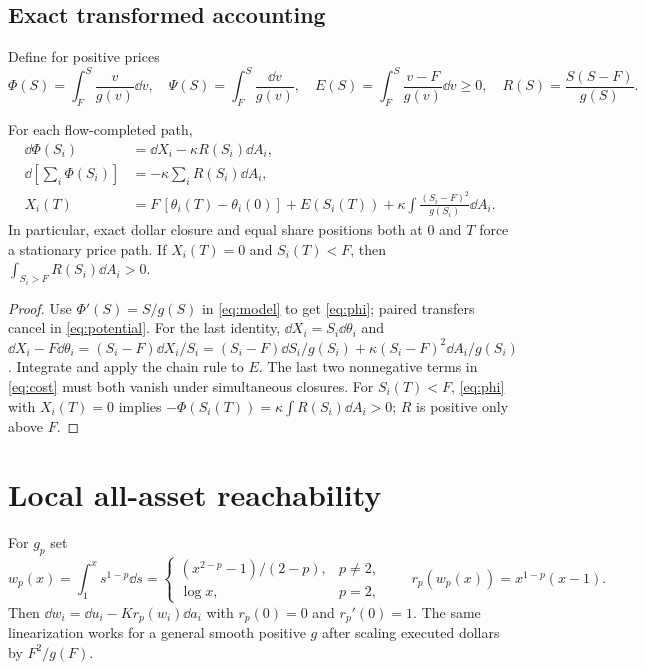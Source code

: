 \documentclass[review,hidelinks,onefignum,onetabnum]{siamonline250211}%
\begin{document}
\subsection{Exact transformed accounting}
Define for positive prices
\begin{equation}\label{eq:coords}
 \Phi(S)=\int_F^S\frac{v}{g(v)}\dd v,\quad
 \Psi(S)=\int_F^S\frac{\dd v}{g(v)},\quad
 E(S)=\int_F^S\frac{v-F}{g(v)}\dd v\ge0,\quad
 R(S)=\frac{S(S-F)}{g(S)}.
\end{equation}
\begin{proposition}\label{prop:account}
For each flow-completed path,
\begin{align}
 \dd\Phi(S_i)&=\dd X_i-\kappa R(S_i)\dd A_i,\label{eq:phi}\\
 \dd\left[\sum_i\Phi(S_i)\right]&=-\kappa\sum_iR(S_i)\dd A_i,\label{eq:potential}\\
 X_i(T)&=F\,[\theta_i(T)-\theta_i(0)]+E(S_i(T))
  +\kappa\int\frac{(S_i-F)^2}{g(S_i)}\dd A_i.\label{eq:cost}
\end{align}
In particular, exact dollar closure and equal share positions both at $0$
and $T$ force a stationary price path. If $X_i(T)=0$ and $S_i(T)<F$,
then $\int_{S_i>F}R(S_i)\dd A_i>0$.
\end{proposition}
\begin{proof}
Use $\Phi'(S)=S/g(S)$ in \eqref{eq:model} to get \eqref{eq:phi};
paired transfers cancel in \eqref{eq:potential}. For the last identity,
$\dd X_i=S_i\dd\theta_i$ and
$\dd X_i-F\dd\theta_i=(S_i-F)\dd X_i/S_i
=(S_i-F)\dd S_i/g(S_i)+\kappa(S_i-F)^2\dd A_i/g(S_i)$.
Integrate and apply the chain rule to $E$.
The last two nonnegative terms in \eqref{eq:cost} must both vanish under
simultaneous closures. For $S_i(T)<F$, \eqref{eq:phi} with $X_i(T)=0$
implies $-\Phi(S_i(T))=\kappa\int R(S_i)\dd A_i>0$;
$R$ is positive only above $F$.
\end{proof}

\section{Local all-asset reachability}\label{sec:local}
For $g_p$ set
\begin{equation}\label{eq:w}
 w_p(x)=\int_1^x s^{1-p}\dd s
 =\begin{cases}(x^{2-p}-1)/(2-p),&p\ne2,\\ \log x,&p=2,\end{cases}
 \qquad r_p(w_p(x))=x^{1-p}(x-1).
\end{equation}
Then $\dd w_i=\dd u_i-Kr_p(w_i)\dd a_i$ with
$r_p(0)=0$ and $r_p'(0)=1$. The same linearization works for a general
smooth positive $g$ after scaling executed dollars by $F^2/g(F)$.
\end{document}
